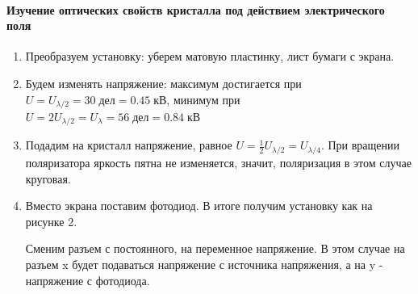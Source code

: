 \documentclass[a4paper,12pt]{article}
\begin{document}
\paragraph{Изучение оптических свойств кристалла под действием электрического поля}
\begin{enumerate}
\itemsep0em
\item Преобразуем установку: уберем матовую пластинку, лист бумаги с экрана. 
\item Будем изменять напряжение: максимум достигается при $U = U_{\lambda/2} = 30\;\text{дел} = 0.45\;\text{кВ}$, минимум при $U = 2U_{\lambda/2} = U_{\lambda}= 56\;\text{дел} = 0.84\;\text{кВ}$
\item Подадим на кристалл напряжение, равное $U = \frac{1}{2}U_{\lambda/2}=U_{\lambda/4}$. При вращении поляризатора яркость пятна не изменяется, значит, поляризация в этом случае круговая. 
\item Вместо экрана поставим фотодиод. В итоге получим установку как на рисунке 2.

 Сменим разъем с постоянного, на переменное напряжение. В этом случае на разъем x будет подаваться напряжение с источника напряжения, а на y - напряжение с фотодиода.  


\end{enumerate}
\end{document}
